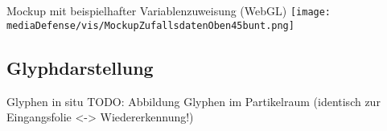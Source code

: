 \documentclass[10pt]{beamer}
\begin{document}
%
%
\begin{frame}{Mockup mit beispielhafter Variablenzuweisung (WebGL)}
	\texttt{[image: mediaDefense/vis/MockupZufallsdatenOben45bunt.png]}
\end{frame}

\subsection{Glyphdarstellung} %

\begin{frame}{Glyphen in situ}
	TODO: Abbildung Glyphen im Partikelraum (identisch zur Eingangsfolie <-> Wiedererkennung!)
\end{frame}
\end{document}
